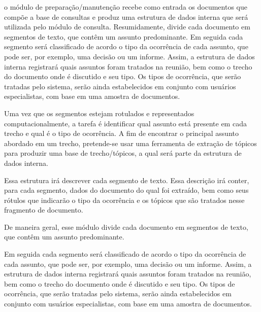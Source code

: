 o módulo de preparação/manutenção recebe como entrada os documentos que compõe a base de consultas e produz uma estrutura de dados interna que será utilizada pelo módulo de consulta. Resumidamente, divide cada documento em segmentos de texto, que contêm um assunto predominante. Em seguida cada segmento será classificado de acordo o tipo da ocorrência de cada assunto, que pode ser, por exemplo, uma decisão ou um informe. Assim, a estrutura de dados interna registrará quais assuntos foram tratados na reunião, bem como o trecho do documento onde é discutido e seu tipo. Os tipos de ocorrência, que serão tratadas pelo sistema, serão ainda estabelecidos em conjunto com usuários especialistas, com base em uma amostra de documentos.

Uma vez que os segmentos estejam rotulados e representados computacionalmente, a tarefa é identificar qual assunto está presente em cada trecho e qual é o tipo de ocorrência. A fim de encontrar o principal assunto abordado em um trecho, pretende-se usar uma ferramenta de extração de tópicos para produzir uma base de trecho/tópicos, a qual será parte da estrutura de dados interna.

Essa estrutura irá descrever cada segmento de texto. Essa descrição irá conter, para cada segmento, dados do documento do qual foi extraído, bem como seus rótulos que indicarão o tipo da ocorrência e os tópicos que são tratados nesse fragmento de documento.

De maneira geral, esse módulo divide cada documento em segmentos de texto, que contêm um assunto predominante. 


Em seguida cada segmento será classificado de acordo o tipo da ocorrência de cada assunto, que pode ser, por exemplo, uma decisão ou um informe. Assim, a estrutura de dados interna registrará quais assuntos foram tratados na reunião, bem como o trecho do documento onde é discutido e seu tipo. Os tipos de ocorrência, que serão tratadas pelo sistema, serão ainda estabelecidos em conjunto com usuários especialistas, com base em uma amostra de documentos.





















